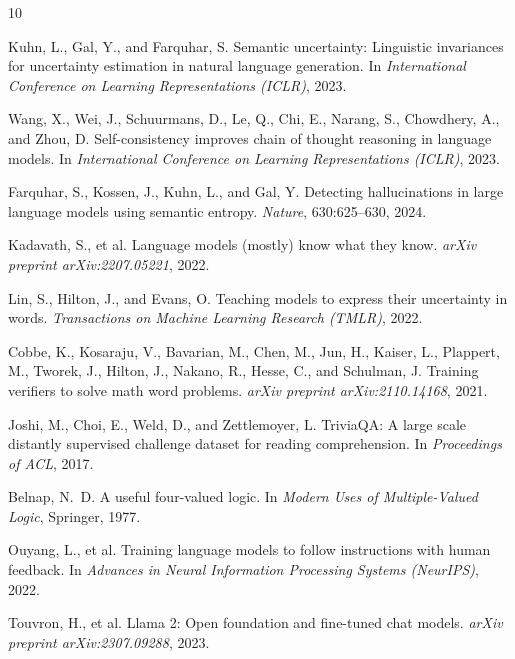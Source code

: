 \documentclass[11pt]{article}
\begin{document}
\begin{thebibliography}{10}

Kuhn, L., Gal, Y., and Farquhar, S.
\newblock Semantic uncertainty: Linguistic invariances for uncertainty estimation in natural language generation.
\newblock In \textit{International Conference on Learning Representations (ICLR)}, 2023.

Wang, X., Wei, J., Schuurmans, D., Le, Q., Chi, E., Narang, S., Chowdhery, A., and Zhou, D.
\newblock Self-consistency improves chain of thought reasoning in language models.
\newblock In \textit{International Conference on Learning Representations (ICLR)}, 2023.

Farquhar, S., Kossen, J., Kuhn, L., and Gal, Y.
\newblock Detecting hallucinations in large language models using semantic entropy.
\newblock \textit{Nature}, 630:625--630, 2024.

Kadavath, S., et al.
\newblock Language models (mostly) know what they know.
\newblock \textit{arXiv preprint arXiv:2207.05221}, 2022.

Lin, S., Hilton, J., and Evans, O.
\newblock Teaching models to express their uncertainty in words.
\newblock \textit{Transactions on Machine Learning Research (TMLR)}, 2022.

Cobbe, K., Kosaraju, V., Bavarian, M., Chen, M., Jun, H., Kaiser, L., Plappert, M., Tworek, J., Hilton, J., Nakano, R., Hesse, C., and Schulman, J.
\newblock Training verifiers to solve math word problems.
\newblock \textit{arXiv preprint arXiv:2110.14168}, 2021.

Joshi, M., Choi, E., Weld, D., and Zettlemoyer, L.
\newblock TriviaQA: A large scale distantly supervised challenge dataset for reading comprehension.
\newblock In \textit{Proceedings of ACL}, 2017.

Belnap, N.~D.
\newblock A useful four-valued logic.
\newblock In \textit{Modern Uses of Multiple-Valued Logic}, Springer, 1977.

Ouyang, L., et al.
\newblock Training language models to follow instructions with human feedback.
\newblock In \textit{Advances in Neural Information Processing Systems (NeurIPS)}, 2022.

Touvron, H., et al.
\newblock Llama 2: Open foundation and fine-tuned chat models.
\newblock \textit{arXiv preprint arXiv:2307.09288}, 2023.

\end{thebibliography}
\end{document}
